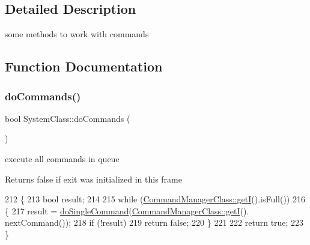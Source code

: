 \subsection{Detailed Description}
some methods to work with commands 

\subsection{Function Documentation}
\mbox{\label{group__commands_ga8007871209331455c3f7aa5b2991b061}} 
\subsubsection{\texorpdfstring{do\+Commands()}{doCommands()}}
{\footnotesize\ttfamily bool System\+Class\+::do\+Commands (\begin{DoxyParamCaption}{ }\end{DoxyParamCaption})\hspace{0.3cm}{\ttfamily [private]}}



execute all commands in queue 

\begin{DoxyReturn}{Returns}
false if exit was initialized in this frame 
\end{DoxyReturn}

\begin{DoxyCode}
212 \{
213     \textcolor{keywordtype}{bool} result;
214 
215     \textcolor{keywordflow}{while} (\hyperlink{class_command_manager_class_a5086ba410f5bb7af25db58e9c5b16d27}{CommandManagerClass::getI}().isFull())
216     \{
217         result = \hyperlink{group__commands_gaafe0a61b5a2144016008ca529067862a}{doSingleCommand}(\hyperlink{class_command_manager_class_a5086ba410f5bb7af25db58e9c5b16d27}{CommandManagerClass::getI}().
      nextCommand());
218         \textcolor{keywordflow}{if} (!result)
219             \textcolor{keywordflow}{return} \textcolor{keyword}{false};
220     \}
221 
222     \textcolor{keywordflow}{return} \textcolor{keyword}{true};
223 \}
\end{DoxyCode}
\mbox{\label{group__commands_gaafe0a61b5a2144016008ca529067862a}} 
